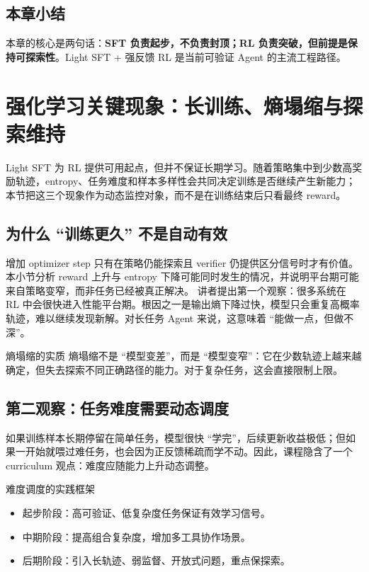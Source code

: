 \documentclass[a4paper]{article}
\begin{document}
\subsection{本章小结}
本章的核心是两句话：\textbf{SFT 负责起步，不负责封顶；RL 负责突破，但前提是保持可探索性}。Light SFT + 强反馈 RL 是当前可验证 Agent 的主流工程路径。

\section{强化学习关键现象：长训练、熵塌缩与探索维持}

Light SFT 为 RL 提供可用起点，但并不保证长期学习。随着策略集中到少数高奖励轨迹，entropy、任务难度和样本多样性会共同决定训练是否继续产生新能力；本节把这三个现象作为动态监控对象，而不是在训练结束后只看最终 reward。

\subsection{为什么 ``训练更久'' 不是自动有效}
增加 optimizer step 只有在策略仍能探索且 verifier 仍提供区分信号时才有价值。本小节分析 reward 上升与 entropy 下降可能同时发生的情况，并说明平台期可能来自策略变窄，而非任务已经被真正解决。
讲者提出第一个观察：很多系统在 RL 中会很快进入性能平台期。根因之一是输出熵下降过快，模型只会重复高概率轨迹，难以继续发现新解。对长任务 Agent 来说，这意味着 ``能做一点，但做不深''。

\begin{importantbox}{熵塌缩的实质}
熵塌缩不是 ``模型变差''，而是 ``模型变窄''：它在少数轨迹上越来越确定，但失去探索不同正确路径的能力。对于复杂任务，这会直接限制上限。
\end{importantbox}

\subsection{第二观察：任务难度需要动态调度}
如果训练样本长期停留在简单任务，模型很快 ``学完''，后续更新收益极低；但如果一开始就喂过难任务，也会因为正反馈稀疏而学不动。因此，课程隐含了一个 curriculum 观点：难度应随能力上升动态调整。

\begin{knowledgebox}{难度调度的实践框架}
\begin{itemize}
    \item 起步阶段：高可验证、低复杂度任务保证有效学习信号。
    \item 中期阶段：提高组合复杂度，增加多工具协作场景。
    \item 后期阶段：引入长轨迹、弱监督、开放式问题，重点保探索。
\end{itemize}
\end{knowledgebox}
\end{document}
